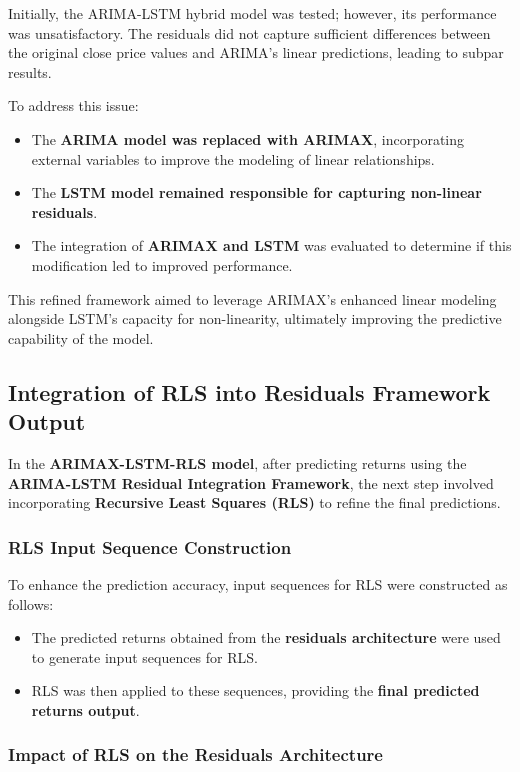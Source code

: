 Initially, the ARIMA-LSTM hybrid model was tested; however, its performance was unsatisfactory. The residuals did not capture sufficient differences between the original close price values and ARIMA’s linear predictions, leading to subpar results. 

To address this issue:
\begin{itemize}
    \item The \textbf{ARIMA model was replaced with ARIMAX}, incorporating external variables to improve the modeling of linear relationships.
    \item The \textbf{LSTM model remained responsible for capturing non-linear residuals}.
    \item The integration of \textbf{ARIMAX and LSTM} was evaluated to determine if this modification led to improved performance.
\end{itemize}

This refined framework aimed to leverage ARIMAX's enhanced linear modeling alongside LSTM's capacity for non-linearity, ultimately improving the predictive capability of the model.

\subsection{Integration of RLS into Residuals Framework Output}

In the \textbf{ARIMAX-LSTM-RLS model}, after predicting returns using the \textbf{ARIMA-LSTM Residual Integration Framework}, the next step involved incorporating \textbf{Recursive Least Squares (RLS)} to refine the final predictions.

\subsubsection{RLS Input Sequence Construction}

To enhance the prediction accuracy, input sequences for RLS were constructed as follows:
\begin{itemize}
    \item The predicted returns obtained from the \textbf{residuals architecture} were used to generate input sequences for RLS.
    \item RLS was then applied to these sequences, providing the \textbf{final predicted returns output}.
\end{itemize}

\subsubsection{Impact of RLS on the Residuals Architecture}

